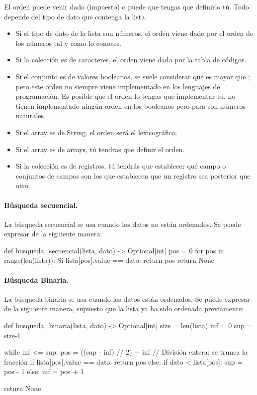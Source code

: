\vspace{0.5cm}
\noindent
El orden puede venir dado (impuesto) o puede que tengas que definirlo tú.
Todo depende del tipo de dato que contenga la lista.
\begin{itemize}
\item Si el tipo de dato de la lista son números, el orden viene dado por el orden de los números tal y como lo conoces.
\item Si la colección es de caracteres, el orden viene dada por la tabla de códigos.
\item Si el conjunto es de valores booleanos, se suele considerar que  es mayor que ; pero este orden no siempre viene implementado en los lenguajes de programación. Es posible que el orden lo tengas que implementar tú.  no tienen implementado ningún orden en los booleanos pero para  son números naturales.
\item Si el array es de String, el orden será el lexicográfico. 
\item Si el array es de arrays, tú tendras que definir el orden.
\item Si la colección es de registros, tú tendrás que establecer qué campo o conjuntos de campos son los que establecen que un registro sea posterior que otro.
\end{itemize}


\paragraph*{Búsqueda secuencial.} La búsqueda secuencial se usa cuando los datos no están ordenados. Se puede expresar de la siguiente manera:


\begin{pyverbatim}[][frame=single]
def busqueda_secuencial(lista, dato) -> Optional[int]
  pos = 0  
  for pos in range(len(lista)):
    Si lista[pos].value == dato:
      return pos 
  return None
\end{pyverbatim}


\paragraph*{Búsqueda Binaria.} La búsqueda binaria se usa cuando los datos  están ordenados. Se puede expresar de la siguiente manera, supuesto que la lista ya ha sido ordenada previamente:


\begin{pyverbatim}[][frame=single]
def busqueda_binaria(lista, dato) -> Optional[int]
  size = len(lista)
  inf = 0
  sup = size-1
    
  while inf <= sup:
    pos = ((sup - inf) // 2) + inf // División entera: se trunca la fracción
    if lista[pos].value == dato:
      return pos
    else:
      if dato < lista[pos]:
        sup = pos - 1
      else:
        inf = pos + 1

  return None
\end{pyverbatim}




